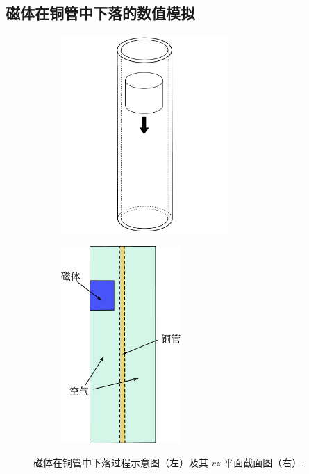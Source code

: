 \subsection{磁体在铜管中下落的数值模拟}
\begin{figure}[htpb]
\begin{subfigure}[t]{0.49\linewidth}
    \centering
    \includegraphics[width=0.7\textwidth]{./figures/movingmaxwell/magnet_falling.pdf}
\end{subfigure}
\begin{subfigure}[t]{0.49\linewidth}
    \centering
    \includegraphics[width=0.5\textwidth]{./figures/movingmaxwell/magnet_falling_rz.pdf}
\end{subfigure}
\caption{磁体在铜管中下落过程示意图（左）及其 $rz$ 平面截面图（右）.}
\label{fig:eddy_current}
\end{figure}
